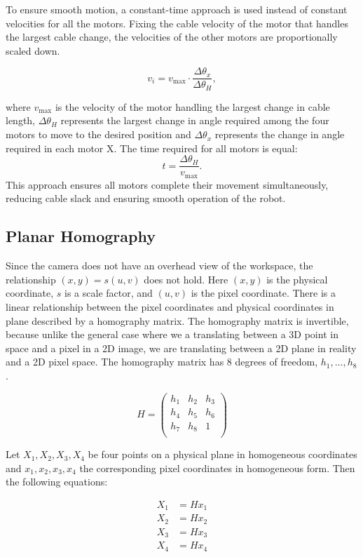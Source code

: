 \documentclass[11pt]{article}
\begin{document}
To ensure smooth motion, a constant-time approach is used instead of constant velocities for all the motors. Fixing the cable velocity of the motor that handles the largest cable change, the velocities of the other motors are proportionally scaled down.

\[
v_i = v_{\text{max}} \cdot \frac{\Delta \theta_x}{\Delta \theta_H},
\]

where \( v_{\text{max}} \) is the velocity of the motor handling the largest change in cable length, \(\Delta \theta_H \) represents the largest change in angle required among the four motors to move to the desired position and \( \Delta \theta_x \) represents the change in angle required in each motor X.
\vspace{0.2cm}
\noindent
The time required for all motors is equal:
\[
t = \frac{\Delta \theta_H}{v_{\text{max}}}.
\]
\noindent
This approach ensures all motors complete their movement simultaneously, reducing cable slack and ensuring smooth operation of the robot.

\subsection{Planar Homography}

Since the camera does not have an overhead view of the workspace, the relationship $(x, y) = s(u, v)$ does not hold. Here
$(x, y)$ is the physical coordinate, $s$ is a scale factor, and $(u, v)$ is the pixel coordinate. There is a linear
relationship between the pixel coordinates and physical coordinates in plane described by a homography matrix. The homography
matrix is invertible, because unlike the general case where we a translating between a 3D point in space and a pixel in a 2D image,
we are translating between a 2D plane in reality and a 2D pixel space. The homography matrix has 8 degrees of freedom, $h_1, \dots, h_8$.

$$ H =
\begin{pmatrix}
h_1 & h_2 & h_3 \\
h_4 & h_5 & h_6 \\
h_7 & h_8 & 1 \\
\end{pmatrix}
$$

Let $X_1, X_2, X_3, X_4$ be four points on a physical plane in homogeneous coordinates and $x_1, x_2, x_3, x_4$ the corresponding pixel coordinates in homogeneous form.
Then the following equations:

\begin{align*}
X_1 &= Hx_1 \\
X_2 &= Hx_2 \\
X_3 &= Hx_3 \\
X_4 &= Hx_4
\end{align*}
\end{document}

